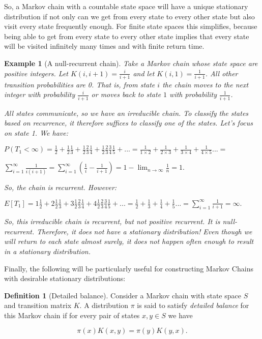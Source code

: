 \documentclass{book}
\theoremstyle{plain}%
\newtheorem{prototheorem}{Example}[section]
\newenvironment{cexample}
   {\colorlet{shadecolor}{gray!10}\begin{shaded}\begin{prototheorem}}
   {\end{prototheorem}\end{shaded}}
\theoremstyle{definition}
\newtheorem{definition}{Definition}[section]
\newlength{\arrow}
\begin{document}
So, a Markov chain with a countable state space will have a unique stationary distribution if not only can we get from every state to every other state but also visit every state frequently enough. For finite state spaces this simplifies, because being able to get from every state to every other state implies that every state will be visited infinitely many times and with finite return time.


\begin{cexample}[A null-recurrent chain]

Take a Markov chain whose state space are positive integers. Let $K(i, i + 1) = \frac{i}{i+1}$ and let $K(i, 1) = \frac{1}{i + 1}$. All other transition probabilities are 0. That is, from state $i$ the chain moves to the next integer with probability $\frac{i}{i+1}$ or moves back to state $1$ with probability $\frac{1}{i + 1}$.

All states communicate, so we have an irreducible chain. To classify the states based on recurrence, it therefore suffices to classify one of the states. Let's focus on state 1. We have:

$P(T_1 < \infty) = \frac{1}{2} + \frac{1}{2}\frac{1}{3} + \frac{1}{2}\frac{2}{3}\frac{1}{4} +  \frac{1}{2}\frac{2}{3}\frac{3}{4}\frac{1}{5} + ... =  \frac{1}{1 \times 2} + \frac{1}{2 \times 3} + \frac{1}{3 \times 4} + \frac{1}{4 \times 5}  ... =$

$\sum_{i = 1}^\infty  \frac{1}{i(i+1)} = \sum_{i = 1}^\infty  (\frac{1}{i} - \frac{1}{i+1}) = 1 - \lim_{n\rightarrow\infty} \frac{1}{n} = 1.$

So, the chain is recurrent. However:

$E[T_1] = 1\frac{1}{2} + 2\frac{1}{2}\frac{1}{3} + 3\frac{1}{2}\frac{2}{3}\frac{1}{4} +  4\frac{1}{2}\frac{2}{3}\frac{3}{4}\frac{1}{5} + ... =  \frac{1}{2} + \frac{1}{3} + \frac{1}{4} + \frac{1}{5}  ... =  \sum_{i = 1}^\infty  \frac{1}{i+1} = \infty.$

So, this irreducible chain is recurrent, but not positive recurrent. It is null-recurrent. Therefore, it does not have a stationary distribution! Even though we will return to each state almost surely, it does not happen often enough to result in a stationary distribution.
\label{ex:markov_chain01}
\end{cexample}


Finally, the following will be particularly useful for constructing Markov Chains with desirable stationary distributions:

\begin{definition}[Detailed balance] Consider a Markov chain with state space $S$ and transition matrix $K$. A distribution $\pi$ is said to satisfy \emph{detailed balance} for this Markov chain if for every pair of states $x, y \in S$ we have

$$\pi(x)K(x,y) = \pi(y)K(y,x).$$
\end{definition}
\end{document}

